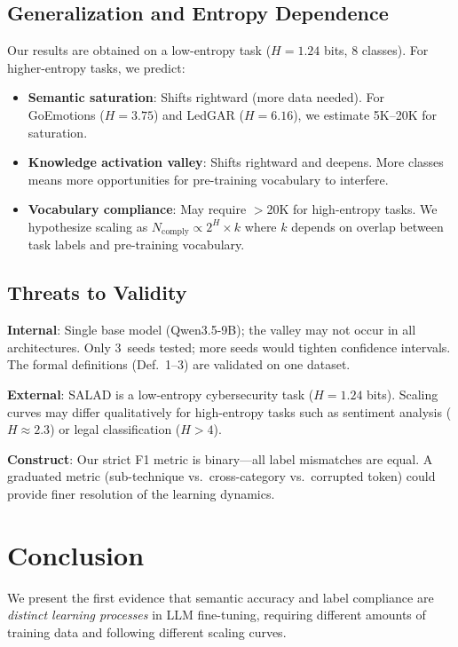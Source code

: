 \documentclass[review,3p]{elsarticle}
\begin{document}
\subsection{Generalization and Entropy Dependence}
Our results are obtained on a low-entropy task ($H = 1.24$ bits, 8 classes). For higher-entropy tasks, we predict:
\begin{itemize}
\item \textbf{Semantic saturation}: Shifts rightward (more data needed). For GoEmotions ($H = 3.75$) and LedGAR ($H = 6.16$), we estimate 5K--20K for saturation.
\item \textbf{Knowledge activation valley}: Shifts rightward and deepens. More classes means more opportunities for pre-training vocabulary to interfere.
\item \textbf{Vocabulary compliance}: May require $>$20K for high-entropy tasks. We hypothesize scaling as $N_\text{comply} \propto 2^{H} \times k$ where $k$ depends on overlap between task labels and pre-training vocabulary.
\end{itemize}

\subsection{Threats to Validity}
\textbf{Internal}: Single base model (Qwen3.5-9B); the valley may not occur in all architectures. Only 3~seeds tested; more seeds would tighten confidence intervals. The formal definitions (Def.~1--3) are validated on one dataset.

\textbf{External}: SALAD is a low-entropy cybersecurity task ($H=1.24$ bits). Scaling curves may differ qualitatively for high-entropy tasks such as sentiment analysis ($H \approx 2.3$) or legal classification ($H > 4$).

\textbf{Construct}: Our strict F1 metric is binary---all label mismatches are equal. A graduated metric (sub-technique vs.\ cross-category vs.\ corrupted token) could provide finer resolution of the learning dynamics.

\section{Conclusion}

We present the first evidence that semantic accuracy and label compliance are \emph{distinct learning processes} in LLM fine-tuning, requiring different amounts of training data and following different scaling curves.
\end{document}
